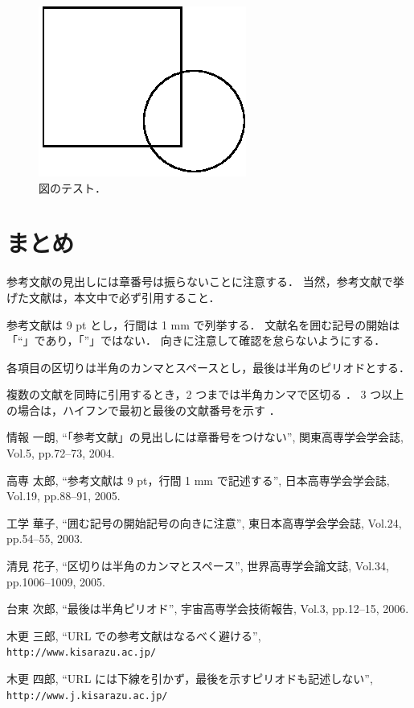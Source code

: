 \documentclass[twocolumn]{jarticle}
\begin{document}
\begin{figure}[t]
 \begin{center}
  \includegraphics{test.eps}
  \caption{図のテスト．}
  \label{fig:test}
 \end{center}
\end{figure}

\section{まとめ}

参考文献の見出しには章番号は振らないことに注意する．
%
当然，参考文献で挙げた文献は，本文中で必ず引用すること．

参考文献は 9 pt とし，行間は 1 mm で列挙する．
%
文献名を囲む記号の開始は「``」であり，「''」ではない．
%
向きに注意して確認を怠らないようにする．

各項目の区切りは半角のカンマとスペースとし，最後は半角のピリオドとする．

複数の文献を同時に引用するとき，2 つまでは半角カンマで区切る
\cite{lit:一朗, lit:太郎}．
%
3 つ以上の場合は，ハイフンで最初と最後の文献番号を示す
\cite{lit:華子, lit:花子, lit:次郎, lit:三郎, lit:四郎}．


\begin{thebibliography}{9}
 \renewcommand{\baselinestretch}{1.0}
 \small
	 情報 一朗,
	 ``「参考文献」の見出しには章番号をつけない'',
	 関東高専学会学会誌, Vol.5, pp.72--73, 2004.

	 高専 太郎,
	 ``参考文献は 9 pt，行間 1 mm で記述する'',
	 日本高専学会学会誌, Vol.19, pp.88--91, 2005.

	 工学 華子,
	 ``囲む記号の開始記号の向きに注意'',
	 東日本高専学会学会誌, Vol.24, pp.54--55, 2003.

	 清見 花子,
	 ``区切りは半角のカンマとスペース'',
	 世界高専学会論文誌, Vol.34, pp.1006--1009, 2005.

	 台東 次郎,
	 ``最後は半角ピリオド'',
	 宇宙高専学会技術報告, Vol.3, pp.12--15, 2006.

	 木更 三郎,
	 ``URL での参考文献はなるべく避ける'', \\
	 \verb|http://www.kisarazu.ac.jp/|

	 木更 四郎,
	 ``URL には下線を引かず，最後を示すピリオドも記述しない'', \\
	 \verb|http://www.j.kisarazu.ac.jp/|

\end{thebibliography}
\end{document}
